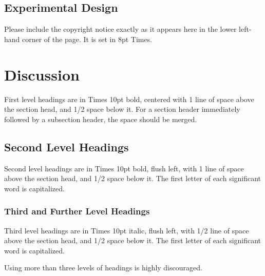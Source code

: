 \documentclass{article}
\begin{document}
\subsection{Experimental Design}

Please include the copyright notice exactly as it appears here in the lower left-hand corner of the page.
It is set in 8pt Times.


\section{Discussion}

First level headings are in Times 10pt bold,
centered with 1 line of space above the section head, and 1/2 space below it.
For a section header immediately followed by a subsection header, the space should be merged.

\subsection{Second Level Headings}

Second level headings are in Times 10pt bold, flush left,
with 1 line of space above the section head, and 1/2 space below it.
The first letter of each significant word is capitalized.

\subsubsection{Third and Further Level Headings}

Third level headings are in Times 10pt italic, flush left,
with 1/2 line of space above the section head, and 1/2 space below it.
The first letter of each significant word is capitalized.

Using more than three levels of headings is highly discouraged.



\end{document}
